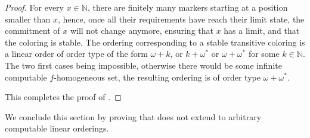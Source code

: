 \documentclass{article}
\newtheorem{theorem}{Theorem}
\numberwithin{theorem}{section}
\newcommand{\NN}[0]{\mathbb{N}}
\begin{document}
\begin{proof}
For every $x \in \NN$, there are finitely many markers starting at a position smaller than $x$, hence, once all their requirements have reach their limit state, the commitment of $x$ will not change anymore, ensuring that $x$ has a limit, and that the coloring is stable. The ordering corresponding to a stable transitive coloring is a linear order of order type of the form $\omega + k$, or $k + \omega^*$ or $\omega + \omega^*$ for some $k \in \NN$. The two first cases being impossible, otherwise there would be some infinite computable $f$-homogeneous set, the resulting ordering is of order type $\omega + \omega^*$.



This completes the proof of .
\end{proof}




We conclude this section by proving that  does not extend to arbitrary computable linear orderings.

\end{document}
